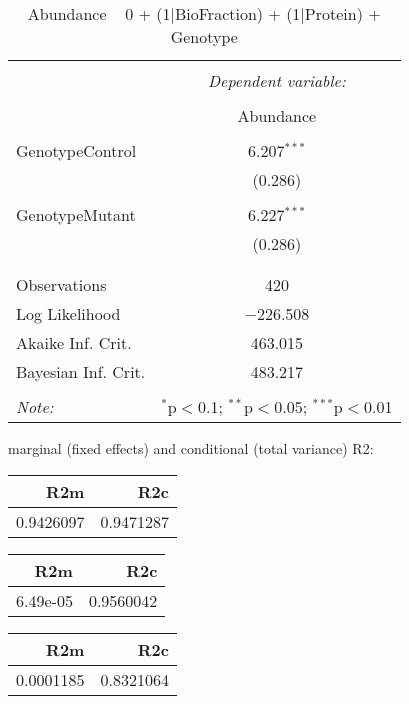 \documentclass[11pt]{report}
\begin{document}
\begin{table}[!htbp] \centering 
  \caption{Abundance ~ 0 + (1|BioFraction) + (1|Protein) + Genotype} 
  \label{} 
\begin{tabular}{@{\extracolsep{5pt}}lc} 
\\[-1.8ex]\hline 
\hline \\[-1.8ex] 
 & \multicolumn{1}{c}{\textit{Dependent variable:}} \\ 
\cline{2-2} 
\\[-1.8ex] & Abundance \\ 
\hline \\[-1.8ex] 
 GenotypeControl & 6.207$^{***}$ \\ 
  & (0.286) \\ 
  & \\ 
 GenotypeMutant & 6.227$^{***}$ \\ 
  & (0.286) \\ 
  & \\ 
\hline \\[-1.8ex] 
Observations & 420 \\ 
Log Likelihood & $-$226.508 \\ 
Akaike Inf. Crit. & 463.015 \\ 
Bayesian Inf. Crit. & 483.217 \\ 
\hline 
\hline \\[-1.8ex] 
\textit{Note:}  & \multicolumn{1}{r}{$^{*}$p$<$0.1; $^{**}$p$<$0.05; $^{***}$p$<$0.01} \\ 
\end{tabular} 
\end{table} 
marginal (fixed effects) and conditional (total variance) R2:

\begin{tabular}{r|r}
\hline
R2m & R2c\\
\hline
0.9426097 & 0.9471287\\
\hline
\end{tabular}

\begin{tabular}{r|r}
\hline
R2m & R2c\\
\hline
6.49e-05 & 0.9560042\\
\hline
\end{tabular}

\begin{tabular}{r|r}
\hline
R2m & R2c\\
\hline
0.0001185 & 0.8321064\\
\hline
\end{tabular}
\end{document}
